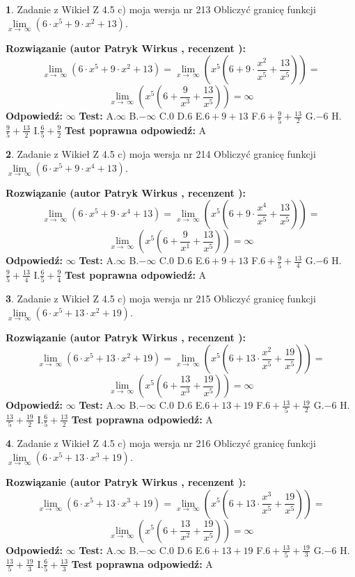 \documentclass[12pt, a4paper]{article}
\theoremstyle{definition} %
\newtheorem{zad}{}
\newcommand{\zadStart}[1]{\begin{zad}#1\newline}
\newcommand{\zadStop}{\end{zad}}
\newcommand{\rozwStart}[2]{\noindent \textbf{Rozwiązanie (autor #1 , recenzent #2): }\newline}
\newcommand{\rozwStop}{\newline}
\newcommand{\odpStart}{\noindent \textbf{Odpowiedź:}\newline}
\newcommand{\odpStop}{\newline}
\newcommand{\testStart}{\noindent \textbf{Test:}\newline}
\newcommand{\testStop}{\newline}
\newcommand{\kluczStart}{\noindent \textbf{Test poprawna odpowiedź:}\newline}
\newcommand{\kluczStop}{\newline}
\begin{document}
\zadStart{Zadanie z Wikieł Z 4.5 c) moja wersja nr 213}
Obliczyć granicę funkcji  $\lim\limits_{x\to\ \infty}(6 \cdot x^{5}+9 \cdot x^{2}+13)$.
\zadStop
\rozwStart{Patryk Wirkus}{}
$$\lim\limits_{x\to\ \infty}(6 \cdot x^{5}+9 \cdot x^{2}+13) = \lim\limits_{x\to\ \infty}(x^{5}(6 +9 \cdot \frac{x^{2}}{x^{5}}+\frac{13}{x^{5}})) =$$ $$\lim\limits_{x\to\ \infty}(x^{5}(6 +\frac{9}{x^{3}}+\frac{13}{x^{5}})) =\infty$$
\rozwStop
\odpStart
$\infty$
\odpStop
\testStart
A.$\infty$ B.$-\infty$ C.$0$ D.$6$ E.$6 + 9 + 13$
F.$6+\frac{9}{5}+\frac{13}{2}$ G.$-6$
H.$\frac{9}{5}+\frac{13}{2}$
I.$\frac{6}{5}+\frac{9}{2}$
\testStop
\kluczStart
A
\kluczStop



\zadStart{Zadanie z Wikieł Z 4.5 c) moja wersja nr 214}
Obliczyć granicę funkcji  $\lim\limits_{x\to\ \infty}(6 \cdot x^{5}+9 \cdot x^{4}+13)$.
\zadStop
\rozwStart{Patryk Wirkus}{}
$$\lim\limits_{x\to\ \infty}(6 \cdot x^{5}+9 \cdot x^{4}+13) = \lim\limits_{x\to\ \infty}(x^{5}(6 +9 \cdot \frac{x^{4}}{x^{5}}+\frac{13}{x^{5}})) =$$ $$\lim\limits_{x\to\ \infty}(x^{5}(6 +\frac{9}{x^{1}}+\frac{13}{x^{5}})) =\infty$$
\rozwStop
\odpStart
$\infty$
\odpStop
\testStart
A.$\infty$ B.$-\infty$ C.$0$ D.$6$ E.$6 + 9 + 13$
F.$6+\frac{9}{5}+\frac{13}{4}$ G.$-6$
H.$\frac{9}{5}+\frac{13}{4}$
I.$\frac{6}{5}+\frac{9}{4}$
\testStop
\kluczStart
A
\kluczStop



\zadStart{Zadanie z Wikieł Z 4.5 c) moja wersja nr 215}
Obliczyć granicę funkcji  $\lim\limits_{x\to\ \infty}(6 \cdot x^{5}+13 \cdot x^{2}+19)$.
\zadStop
\rozwStart{Patryk Wirkus}{}
$$\lim\limits_{x\to\ \infty}(6 \cdot x^{5}+13 \cdot x^{2}+19) = \lim\limits_{x\to\ \infty}(x^{5}(6 +13 \cdot \frac{x^{2}}{x^{5}}+\frac{19}{x^{5}})) =$$ $$\lim\limits_{x\to\ \infty}(x^{5}(6 +\frac{13}{x^{3}}+\frac{19}{x^{5}})) =\infty$$
\rozwStop
\odpStart
$\infty$
\odpStop
\testStart
A.$\infty$ B.$-\infty$ C.$0$ D.$6$ E.$6 + 13 + 19$
F.$6+\frac{13}{5}+\frac{19}{2}$ G.$-6$
H.$\frac{13}{5}+\frac{19}{2}$
I.$\frac{6}{5}+\frac{13}{2}$
\testStop
\kluczStart
A
\kluczStop



\zadStart{Zadanie z Wikieł Z 4.5 c) moja wersja nr 216}
Obliczyć granicę funkcji  $\lim\limits_{x\to\ \infty}(6 \cdot x^{5}+13 \cdot x^{3}+19)$.
\zadStop
\rozwStart{Patryk Wirkus}{}
$$\lim\limits_{x\to\ \infty}(6 \cdot x^{5}+13 \cdot x^{3}+19) = \lim\limits_{x\to\ \infty}(x^{5}(6 +13 \cdot \frac{x^{3}}{x^{5}}+\frac{19}{x^{5}})) =$$ $$\lim\limits_{x\to\ \infty}(x^{5}(6 +\frac{13}{x^{2}}+\frac{19}{x^{5}})) =\infty$$
\rozwStop
\odpStart
$\infty$
\odpStop
\testStart
A.$\infty$ B.$-\infty$ C.$0$ D.$6$ E.$6 + 13 + 19$
F.$6+\frac{13}{5}+\frac{19}{3}$ G.$-6$
H.$\frac{13}{5}+\frac{19}{3}$
I.$\frac{6}{5}+\frac{13}{3}$
\testStop
\kluczStart
A
\kluczStop
\end{document}
